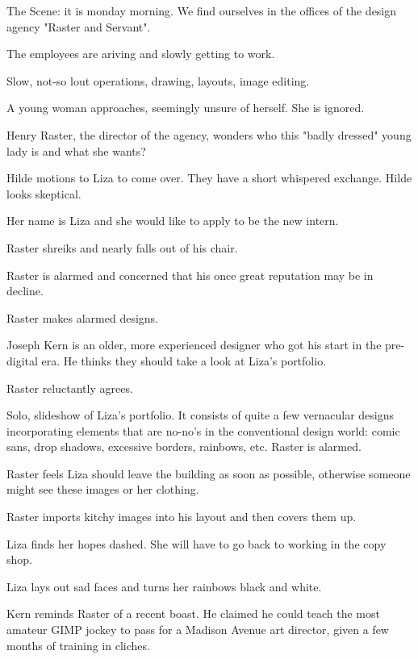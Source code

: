 \act


 The Scene: it is monday morning.  We find ourselves in the offices of the design agency "Raster and Servant".

 The employees are ariving and slowly getting to work.

Slow, not-so lout operations, drawing, layouts, image editing.

 A young woman approaches, seemingly unsure of herself.  She is ignored.

 Henry Raster, the director of the agency, wonders who this "badly dressed" young lady is and what she wants?

Hilde motions to Liza to come over.  They have a short whispered exchange.  Hilde looks skeptical.

 Her name is Liza and she would like to apply to be the new intern. 

Raster shreiks and nearly falls out of his chair.

 Raster is alarmed and concerned that his once great reputation may be in decline.   

Raster makes alarmed designs.

 Joseph Kern is an older, more experienced designer who got his start in the pre-digital era.  He thinks they should take a look at Liza's portfolio.

 Raster reluctantly agrees.

Solo, slideshow of Liza's portfolio.  It consists of quite a few vernacular designs incorporating elements that are no-no's in the conventional design world: comic sans, drop shadows, excessive borders, rainbows, etc.  Raster is alarmed.

 Raster feels Liza should leave the building as soon as possible, otherwise someone might see these images or her clothing.

Raster imports kitchy images into his layout and then covers them up.

 Liza finds her hopes dashed. She will have to go back to working in the copy shop.

Liza lays out sad faces and turns her rainbows black and white.

 Kern reminds Raster of a recent boast.  He claimed he could teach the most amateur GIMP jockey to pass for a Madison Avenue art director, given a few months of training in cliches.

